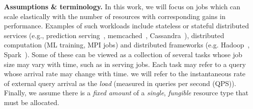 

\insertFigScheme
\textbf{Assumptions \& terminology.}
In this work, %
 we will focus on jobs which can scale elastically with the
number of resources with corresponding gains in performance.
Examples of such workloads include stateless or stateful distributed services
(e.g., prediction serving~\cite{crankshaw2017clipper},
memcached~\cite{fitzpatrick2004distributed},
Cassandra~\cite{lakshman2010cassandra}),
distributed computation (ML training, MPI jobs)
and distributed frameworks
(e.g. Hadoop~\cite{shvachko2010hadoop}, Spark~\cite{zaharia2010spark}).
Some of these can be viewed as a collection of several tasks whose job size may vary with
time,
such as in serving jobs. Each task may refer to a query whose arrival rate may change with
time.
we will refer to the instantaneous rate of external query arrival as the \emph{load}
(measured in queries per second (QPS)).
Finally, we assume there is a \emph{fixed amount} of a \emph{single}, \emph{fungible}
resource type that must be allocated.


\newcommand{\moduleheader}[1]{\textbf{#1.}}


